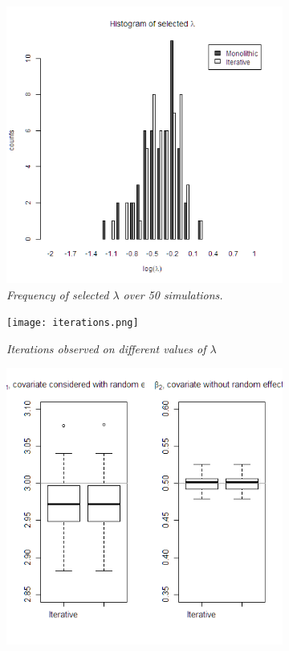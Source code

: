 \begin{figure}[t]
	\centering
	\begin{subfigure}{0.45\textwidth}
		\includegraphics[width=\textwidth]{images/lambda.png}
		\centering
		\caption{\textit{Frequency of selected $\lambda$ over 50 simulations. }}
		\label{lambda}
	\end{subfigure}
	\hfill
	\begin{subfigure}{0.45\textwidth}
		\texttt{[image: iterations.png]}
		\centering
		\caption{\textit{ Iterations observed on different values of $\lambda$ }}
		\label{iterations}
	\end{subfigure}
	\begin{subfigure}{0.45\textwidth}
		\includegraphics[width=\textwidth]{images/beta.png}

\end{subfigure}
\end{figure}
